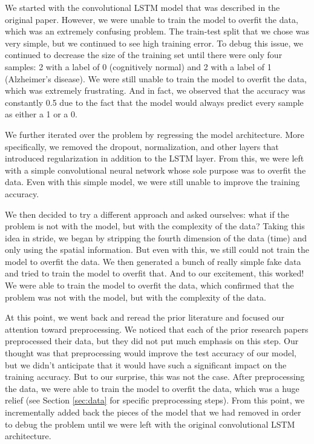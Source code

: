 \documentclass[10pt]{article}
\begin{document}
	We started with the convolutional LSTM model that was described in the original paper. However, we were unable to train the model to overfit the data, which was an extremely confusing problem. The train-test split that we chose was very simple, but we continued to see high training error. To debug this issue, we continued to decrease the size of the training set until there were only four samples: 2 with a label of 0 (cognitively normal) and 2 with a label of 1 (Alzheimer's disease). We were still unable to train the model to overfit the data, which was extremely frustrating. And in fact, we observed that the accuracy was constantly 0.5 due to the fact that the model would always predict every sample as either a 1 or a 0.

	We further iterated over the problem by regressing the model architecture. More specifically, we removed the dropout, normalization, and other layers that introduced regularization in addition to the LSTM layer. From this, we 
	were left with a simple convolutional neural network whose sole purpose was to overfit the data. Even with this simple model, we were still unable to improve the training accuracy. 

	We then decided to try a different approach and asked ourselves: what if the problem is not with the model, but with the complexity of the data? Taking this idea in stride, we began by stripping the fourth dimension of the data (time) and only using the spatial information. But even with this, we still could not train the model to overfit the data. We then generated a bunch of really simple fake data and tried to train the model to overfit that. And to our excitement, this worked! We were able to train the model to overfit the data, which confirmed that the problem was not with the model, but with the complexity of the data.

	At this point, we went back and reread the prior literature and focused our attention toward preprocessing. We noticed that each of the prior research papers preprocessed their data, but they did not put much emphasis on this step. Our thought was that preprocessing would improve the test accuracy of our model, but we didn't anticipate that it would have such a significant impact on the training accuracy. But to our surprise, this was not the case. After preprocessing the data, we were able to train the model to overfit the data, which was a huge relief (see Section \ref{sec:data} for specific preprocessing steps). From this point, we incrementally added back the pieces of the model that we had removed in order to debug the problem until we were left with the original convolutional LSTM architecture. 
	
\end{document}
